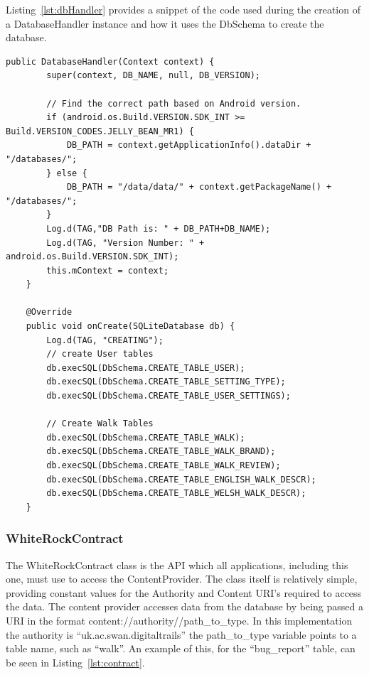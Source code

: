 \documentclass[11pt,a4paper]{article}
\begin{document}
Listing~\ref{lst:dbHandler} provides a snippet of the code used during the creation of a DatabaseHandler instance and how it uses the DbSchema to create the database.

\begin{lstlisting}[captionpos=b, caption=DatabaseHandler Snippet, label=lst:dbHandler, frame=single]
	public DatabaseHandler(Context context) {
		super(context, DB_NAME, null, DB_VERSION);
		
		// Find the correct path based on Android version.
		if (android.os.Build.VERSION.SDK_INT >= Build.VERSION_CODES.JELLY_BEAN_MR1) {
			DB_PATH = context.getApplicationInfo().dataDir + "/databases/";
		} else {
			DB_PATH = "/data/data/" + context.getPackageName() + "/databases/";
		}
		Log.d(TAG,"DB Path is: " + DB_PATH+DB_NAME);
		Log.d(TAG, "Version Number: " + android.os.Build.VERSION.SDK_INT);
		this.mContext = context;
	}

	@Override
	public void onCreate(SQLiteDatabase db) {
		Log.d(TAG, "CREATING");
		// create User tables
		db.execSQL(DbSchema.CREATE_TABLE_USER);
		db.execSQL(DbSchema.CREATE_TABLE_SETTING_TYPE);
		db.execSQL(DbSchema.CREATE_TABLE_USER_SETTINGS);
		
		// Create Walk Tables
		db.execSQL(DbSchema.CREATE_TABLE_WALK);
		db.execSQL(DbSchema.CREATE_TABLE_WALK_BRAND);
		db.execSQL(DbSchema.CREATE_TABLE_WALK_REVIEW);
		db.execSQL(DbSchema.CREATE_TABLE_ENGLISH_WALK_DESCR);
		db.execSQL(DbSchema.CREATE_TABLE_WELSH_WALK_DESCR);
	}
\end{lstlisting}

\subsubsection{WhiteRockContract}
The WhiteRockContract class is the API which all applications, including this one, must use to access the ContentProvider. The class itself is relatively simple, providing constant values for the Authority and Content URI's required to access the data. The content provider accesses data from the database by being passed a URI in the format content://authority//path\_to\_type. In this implementation the authority is ``uk.ac.swan.digitaltrails'' the path\_to\_type variable points to a table name, such as ``walk''. An example of this, for the ``bug\_report'' table, can be seen in Listing~\ref{lst:contract}.
\end{document}
